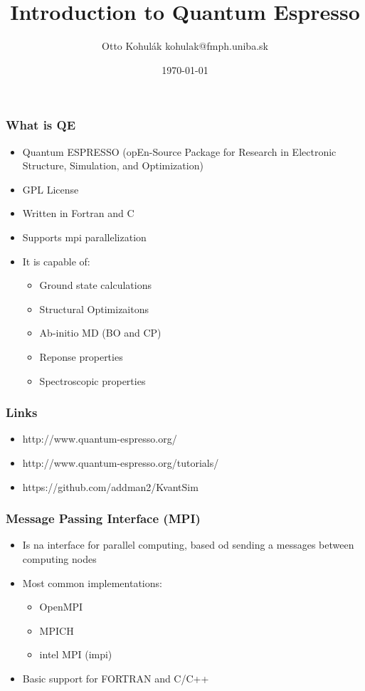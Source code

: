 \documentclass{beamer}
\begin{document}
\title{Introduction to Quantum Espresso}   
\author{Otto Kohul\'{a}k \newline kohulak@fmph.uniba.sk} 
\date{\today} 

\frame{\titlepage} 

\begin{frame}
  \frametitle{What is QE}
  \begin{itemize}
    \item Quantum ESPRESSO (opEn-Source Package for Research in Electronic Structure, Simulation, and Optimization)
    \item GPL License
    \item Written in Fortran and C
    \item Supports mpi parallelization
    \item It is capable of:
    \begin{itemize}
      \item Ground state calculations
      \item Structural Optimizaitons
      \item Ab-initio MD (BO and CP)
      \item Reponse properties
      \item Spectroscopic properties
    \end{itemize}
  \end{itemize}
\end{frame}

\begin{frame}
  \frametitle{Links}
  \begin{itemize}
    \item http://www.quantum-espresso.org/
    \item http://www.quantum-espresso.org/tutorials/
    \item https://github.com/addman2/KvantSim
  \end{itemize}
\end{frame}

\begin{frame}
  \frametitle{Message Passing Interface (MPI)}
  \begin{itemize}
    \item Is na interface for parallel computing, based od sending a messages between computing nodes
    \item Most common implementations:
    \begin{itemize}
      \item OpenMPI
      \item MPICH
      \item intel MPI (impi)
    \end{itemize}
    \item Basic support for FORTRAN and C/C++
  \end{itemize}
\end{frame}
\end{document}
